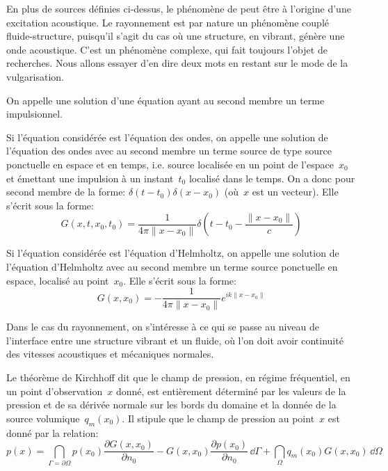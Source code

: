 \medskip
En plus de sources définies ci-dessus, le phénomène de  peut être à l'origine d'une excitation acoustique. Le rayonnement est par nature un phénomène couplé fluide-structure, puisqu'il s'agit du cas où une structure, en vibrant, génère une onde acoustique. C'est un phénomène complexe, qui fait toujours l'objet de recherches. Nous allons essayer d'en dire deux mots en restant sur le mode de la vulgarisation.

\begin{definition}
On appelle  une solution d'une équation ayant au
second membre un terme impulsionnel.

Si l'équation considérée est l'équation des ondes, on appelle  une solution de l'équation des ondes avec au second membre un terme source de type source ponctuelle en espace et en temps, i.e. source localisée en un point de l'espace~$x_0$ et émettant une impulsion à un instant~$t_0$ localisé dans le temps. On a donc pour second membre de la forme: $\delta(t-t_0)\delta(x-x_0)$ (où~$x$ est un vecteur).
Elle s'écrit sous la forme:
\begin{equation}
G(x,t,x_0,t_0)=\dfrac{1}{4\pi\|x-x_0\|}\delta\left(t-t_0-\dfrac{\|x-x_0\|}{c}\right)
\end{equation}

Si l'équation considérée est l'équation d'Helmholtz, on appelle  une solution de l'équation d'Helmholtz avec au second membre un terme source ponctuelle en espace, localisé au point~$x_0$.
Elle s'écrit sous la forme:
\begin{equation}
G(x,x_0)=-\dfrac{1}{4\pi\|x-x_0\|}e^{ik\|x-x_0\|}
\end{equation}
\end{definition}

\medskip
Dans le cas du rayonnement, on s'intéresse à ce qui se passe au niveau de l'interface entre une structure vibrant et un fluide, où l'on doit avoir continuité des vitesses acoustiques et mécaniques normales.
\begin{theoreme}
Le théorème de Kirchhoff dit que le champ de pression, en régime fréquentiel, en un point d'observation~$x$ donné, est entièrement déterminé par les valeurs de la pression et de sa dérivée normale sur les bords du domaine et la donnée de la source volumique~$q_m(x_0)$. Il stipule que le champ de pression au point~$x$ est donné par la relation:
\begin{equation}
p(x)=\dint_{\Gamma=\partial\Omega} p(x_0)\dfrac{\partial G(x,x_0)}{\partial n_0} -G(x,x_0)\dfrac{\partial p(x_0)}{\partial n_0}\,\dd\Gamma + \dint_\Omega q_m(x_0)G(x,x_0)\, \dd\Omega
\end{equation}
\end{theoreme}

